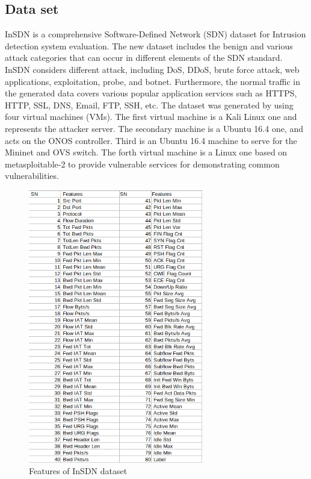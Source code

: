 \subsection{Data set}
\vspace{-18pt}
InSDN is a comprehensive Software-Defined Network (SDN) dataset for Intrusion detection system evaluation. The new dataset includes the benign and various attack categories  that can occur in different elements of the SDN standard. InSDN considers different attack, including DoS, DDoS, brute force attack, web applications, exploitation, probe, and botnet. Furthermore, the normal traffic in the generated data covers  various  popular  application services such as HTTPS, HTTP, SSL, DNS, Email, FTP, SSH, etc. The dataset was generated by using four virtual machines (VMs). The first virtual machine is a Kali Linux one and represents the attacker server. The secondary machine is a Ubuntu 16.4 one, and acts on the ONOS controller. Third is an Ubuntu 16.4 machine to serve for the Mininet and OVS switch. The forth virtual machine is a Linux one based on metasploitable-2 to provide vulnerable services for demonstrating common vulnerabilities.\cite{article}
\begin{figure}[h] %
\begin{center}
	\includegraphics[width=3in]{images/ds2.png} 
	\caption{Features of InSDN dataset} %
	\label{} %
\end{center}
\end{figure}
